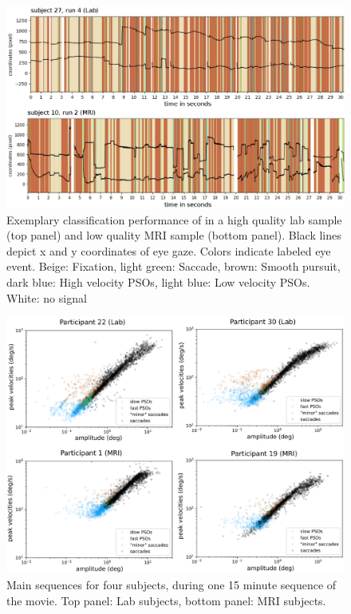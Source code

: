 \begin{figure}[h!]
	\includegraphics[width=1\textwidth]{img/remodnav.eps}
	\caption{Exemplary classification performance of \remodnav in a high quality lab sample (top panel) and low quality MRI sample (bottom panel). Black lines depict x and y coordinates of eye gaze. Colors indicate labeled eye event. Beige: Fixation, light green: Saccade, brown: Smooth pursuit, dark blue: High velocity PSOs, light blue: Low velocity PSOs. White: no signal}
	\label{fig:remodnav}
\end{figure}	

\begin{figure}[h!]
	\includegraphics[width=1\textwidth]{img/main_sequences.eps}
	\caption{Main sequences for four subjects, during one 15 minute sequence of the movie. Top panel: Lab subjects, bottom panel: MRI subjects.}
	\label{fig:mains}
\end{figure}

